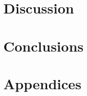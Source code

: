\documentclass[review]{elsarticle}
\begin{document}

\section{Discussion}

%
\section{Conclusions}

%
\section*{Appendices}
\end{document}
